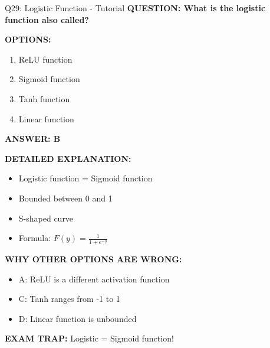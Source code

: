 \documentclass[8pt]{beamer}
\begin{document}
	\begin{frame}{Q29: Logistic Function - Tutorial}
		\fontsize{6.5}{7.5}\selectfont
		\textbf{QUESTION: What is the logistic function also called?}
		
		\vspace{0.1cm}
		\textbf{OPTIONS:}
		\begin{enumerate}
			\item ReLU function
			\item Sigmoid function
			\item Tanh function
			\item Linear function
		\end{enumerate}
		
		\vspace{0.1cm}
		\textcolor{myblue}{\textbf{ANSWER: B}}
		
		\vspace{0.1cm}
		\textbf{DETAILED EXPLANATION:}
		\begin{itemize}
			\item Logistic function = Sigmoid function
			\item Bounded between 0 and 1
			\item S-shaped curve
			\item Formula: $F(y) = \frac{1}{1 + e^{-y}}$
		\end{itemize}
		
		\vspace{0.1cm}
		\textcolor{myred}{\textbf{WHY OTHER OPTIONS ARE WRONG:}}
		\begin{itemize}
			\item \textcolor{myred}{A:} ReLU is a different activation function
			\item \textcolor{myred}{C:} Tanh ranges from -1 to 1
			\item \textcolor{myred}{D:} Linear function is unbounded
		\end{itemize}
		
		\textcolor{myred}{\textbf{EXAM TRAP:}} Logistic = \textcolor{myblue}{Sigmoid} function!
	\end{frame}
	
\end{document}

